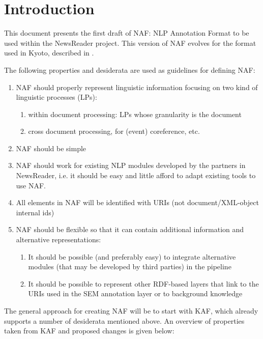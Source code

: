 \section{Introduction}
\label{sec:introduction}

This document presents the first draft of NAF: NLP Annotation Format
to be used within the NewsReader project. This version of NAF evolves for
the format used in Kyoto, described in \cite{KAF}.




The following properties and desiderata are used as guidelines for defining NAF:

\begin{enumerate}
\item NAF should properly represent linguistic information focusing on two
  kind of linguistic processes (LPs):
  \begin{enumerate}
  \item within document processing: LPs whose granularity is the document
  \item cross document processing, for (event) coreference, etc.
  \end{enumerate}
  \item NAF should be simple
  \item NAF should work for existing NLP modules developed by the partners in NewsReader, i.e. it should be easy and little afford to adapt existing tools to use NAF.
  \item All elements in NAF will be identified with URIs (not document/XML-object internal ids)
  \item NAF should be flexible so that it can contain additional information and alternative representations:
  \begin{enumerate}
  \item It should be possible (and preferably easy) to integrate alternative modules (that may be developed by third parties) in the pipeline
  \item It should be possible to represent other RDF-based layers that link to the URIs used in the SEM annotation layer or to background knowledge
  \end{enumerate}
\end{enumerate}

The general approach for creating NAF will be to start with KAF, which already supports a number of desiderata mentioned above.
An overview of properties taken from KAF and proposed changes is given below:

